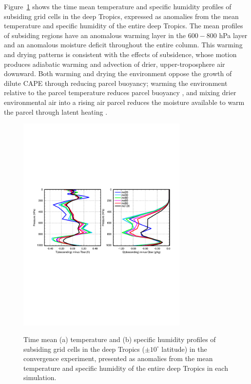 \documentclass[times]{qjrms4}
\begin{document}
Figure~\ref{fig:profiles} shows the time mean temperature and specific humidity profiles of subsiding grid cells in the deep Tropics, expressed as anomalies from the mean temperature and specific humidity of the entire deep Tropics. The mean profiles of subsiding regions have an anomalous warming layer in the $600-800$ hPa layer and an anomalous moisture deficit throughout the entire column. This warming and drying patterns is consistent with the effects of subsidence, whose motion produces adiabatic warming and advection of drier, upper-troposphere air downward. Both warming and drying the environment oppose the growth of dilute CAPE through reducing parcel buoyancy; warming the environment relative to the parcel temperature reduces parcel buoyancy \citep{Z2002JGR}, and mixing drier environmental air into a rising air parcel reduces the moisture available to warm the parcel through latent heating \citep{RB1992JAS}. 

\begin{figure}
\begin{center}
\noindent\includegraphics[width=20pc,angle=0]{figs/temp_profiles.pdf}\\
\end{center}
\caption{Time mean (a) temperature and (b) specific humidity profiles of subsiding grid cells in the deep Tropics ($\pm 10^{\circ}$ latitude) in the convergence experiment, presented as anomalies from the mean temperature and specific humidity of the entire deep Tropics in each simulation.}
\label{fig:profiles}
\end{figure}
\end{document}
